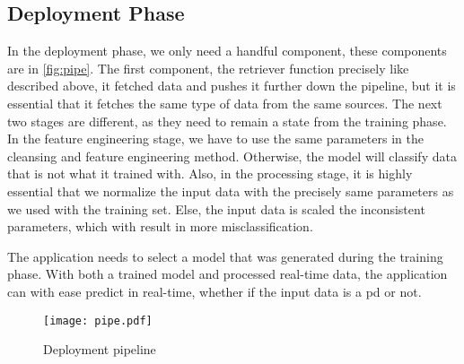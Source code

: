 \subsection{Deployment Phase}
In the deployment phase, we only need a handful component, these components are in \autoref{fig:pipe}. The first component, the retriever function precisely like described above, it fetched data and pushes it further down the pipeline, but it is essential that it fetches the same type of data from the same sources. The next two stages are different, as they need to remain a state from the training phase. In the feature engineering stage, we have to use the same parameters in the cleansing and feature engineering method. Otherwise, the model will classify data that is not what it trained with. Also, in the processing stage, it is highly essential that we normalize the input data with the precisely same parameters as we used with the training set. Else, the input data is scaled the inconsistent parameters, which with result in more misclassification.

The application needs to select a model that was generated during the training phase. With both a trained model and processed real-time data, the application can with ease predict in real-time, whether if the input data is a \ac{pd} or not.

\begin{figure}[h]
    \centering
    \texttt{[image: pipe.pdf]}
    \caption{Deployment pipeline}
    \label{fig:pipe}
\end{figure}